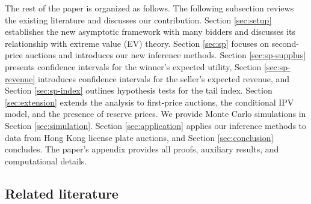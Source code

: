 The rest of the paper is organized as follows. The following subsection reviews the existing literature and discusses our contribution. Section \ref{sec:setup} establishes the new asymptotic framework with many bidders and discusses its relationship with extreme value (EV) theory. Section \ref{sec:sp} focuses on second-price auctions and introduces our new inference methods. Section \ref{sec:sp-supplus} presents confidence intervals for the winner's expected utility, Section \ref{sec:sp-revenue} introduces confidence intervals for the seller's expected revenue, and Section \ref{sec:sp-index} outlines hypothesis tests for the tail index. Section \ref{sec:extension} extends the analysis to first-price auctions, the conditional IPV model, and the presence of reserve prices. We provide Monte Carlo simulations in Section \ref{sec:simulation}. Section \ref{sec:application} applies our inference methods to data from Hong Kong license plate auctions,
and Section \ref{sec:conclusion} concludes. The paper's appendix provides all proofs, auxiliary results, and computational details.

\subsection{Related literature}\label{sec:literature}


